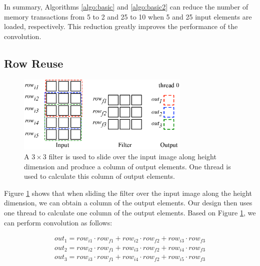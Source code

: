 In summary, Algorithms \ref{algo:basic} and \ref{algo:basic2} can reduce the number of memory transactions from 5 to 2 and 25 to 10 when 5 and 25 input elements are loaded, respectively. This reduction greatly improves the performance of the convolution.

\subsection{Row Reuse}
\label{sec:rowreuse}
\begin{figure}
	\centering
	\includegraphics[width=\columnwidth,height=3.7cm]{./figure/rowreuse.eps}
\caption{A $3 \times 3$ filter is used to slide over the input image along height dimension and produce a column of output elements. One thread is used to calculate this column of output elements.}
\label{fig:rowreuse}
\end{figure}

Figure \ref{fig:rowreuse} shows that when sliding the filter over the input image along the height dimension, we can obtain a column of the output elements. Our design then uses one thread to calculate one column of the output elements. Based on Figure \ref{fig:rowreuse},
we can perform convolution as follows:

\begin{gather*}
  out_1=row_{i1} \cdot row_{f1} + row_{i2} \cdot row_{f2} + row_{i3} \cdot row_{f3} \\
out_{2}=row_{i2} \cdot row_{f1} + row_{i3} \cdot row_{f2} + row_{i4} \cdot row_{f3} \\
	out_{3}=row_{i3} \cdot row_{f1} + row_{i4} \cdot row_{f2} + row_{i5} \cdot row_{f3}
\end{gather*}

